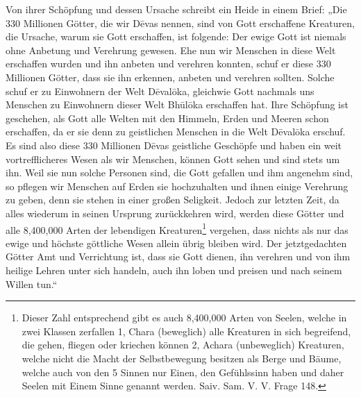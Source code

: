 \documentclass{article}
\begin{document}
Von ihrer Schöpfung und dessen Ursache schreibt ein Heide in einem Brief: „Die 330 Millionen Götter, die wir D\={e}vas nennen, sind von Gott erschaffene Kreaturen, die Ursache, warum sie Gott erschaffen, ist folgende: Der ewige Gott ist niemals ohne Anbetung und Verehrung gewesen. Ehe nun wir Menschen in diese Welt erschaffen wurden und ihn anbeten und verehren konnten, schuf er diese 330 Millionen Götter, dass sie ihn erkennen, anbeten und verehren sollten. Solche schuf er zu Einwohnern der Welt D\={e}val\={o}ka, gleichwie Gott nachmals uns Menschen zu Einwohnern dieser Welt Bh\={u}l\={o}ka erschaffen hat. Ihre Schöpfung ist geschehen, als Gott alle Welten mit den Himmeln, Erden und Meeren schon erschaffen, da er sie denn zu geistlichen Menschen in die Welt D\={e}val\={o}ka erschuf. Es sind also diese 330 Millionen D\={e}vas geistliche Geschöpfe und haben ein weit vortrefflicheres Wesen als wir Menschen, können Gott sehen und sind stets um ihn. Weil sie nun solche Personen sind, die Gott gefallen und ihm angenehm sind, so pflegen wir Menschen auf Erden sie hochzuhalten und ihnen einige Verehrung zu geben, denn sie stehen in einer großen Seligkeit. Jedoch zur letzten Zeit, da alles wiederum in seinen Ursprung zurückkehren wird, werden diese Götter und alle 8,400,000 Arten der lebendigen Kreaturen\footnote{Dieser Zahl entsprechend gibt es auch 8,400,000 Arten von Seelen, welche in zwei Klassen zerfallen 1, Chara (beweglich) alle Kreaturen in sich begreifend, die gehen, fliegen oder kriechen können 2, Achara (unbeweglich) Kreaturen, welche nicht die Macht der Selbstbewegung besitzen als Berge und Bäume, welche auch von den 5 Sinnen nur Einen, den Gefühlssinn haben und daher Seelen mit Einem Sinne genannt werden. Saiv. Sam. V. V. Frage 148.} vergehen, dass nichts als nur das ewige und höchste göttliche Wesen allein übrig bleiben wird. Der jetztgedachten Götter Amt und Verrichtung ist, dass sie Gott dienen, ihn verehren und von ihm heilige Lehren unter sich handeln, auch ihn loben und preisen und nach seinem Willen tun.“
\end{document}
